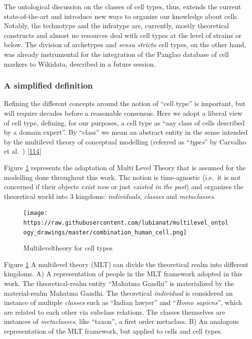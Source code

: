 The ontological discussion on the classes of cell types, thus, extends the current state-of-the-art and introduce new ways to organize our knowledge about cells.
Notably, the technotype and the infratype are, currently, mostly theoretical constructs and almost no resources deal with cell types at the level of strains or below.
The division of archetypes and \emph{sensu stricto} cell types, on the other hand, was already instrumental for the integration of the Panglao database of cell markers to Wikidata, described in a future session.

\hypertarget{a-simplified-definition}{%
\subsubsection{A simplified definition}\label{a-simplified-definition}}

Refining the different concepts around the notion of ``cell type'' is important, but will require decades before a reasonable consensus.
Here we adopt a liberal view of cell type, defining, for our purposes, a cell type as ``any class of cells described by a domain expert''.
By ``class'' we mean an abstract entity in the sense intended by the multilevel theory of conceptual modelling (referred as ``\emph{types}'' by Carvalho et al.~) {[}\protect\hyperlink{ref-eP47FILn}{114}{]}

Figure \ref{fig:multilevel} represents the adaptation of Multi Level Theory that is assumed for the modelling done throughout this work.
The notion is time-agnostic (i.e.~it is not concerned if their objects \emph{exist now} or just \emph{existed in the past}) and organizes the theoretical world into 3 kingdoms: \emph{individuals}, \emph{classes} and \emph{metaclasses}.

\begin{figure}
\hypertarget{fig:multilevel}{%
\centering
\texttt{[image: https://raw.githubusercontent.com/lubianat/multilevel\_ontology\_drawings/master/combination\_human\_cell.png]}
\caption{Multileveltheory for cell types}\label{fig:multilevel}
}
\end{figure}

Figure \ref{fig:multilevel} A multilevel theory (MLT) can divide the theoretical realm into different kingdoms. A) A representation of people in the MLT framework adopted in this work. The theoretical-realm entity ``Mahatma Gandhi'' is materialized by the material-realm Mahatma Gandhi. The theoretical \emph{individual} is considered an instance of multiple \emph{classes} such as ``Indian lawyer'' and ``\emph{Homo sapiens}'', which are related to each other via subclass relations. The classes themselves are instances of \emph{metaclasses}, like ``taxon'', a first order metaclass. B) An analogous representation of the MLT framework, but applied to cells and cell types.

